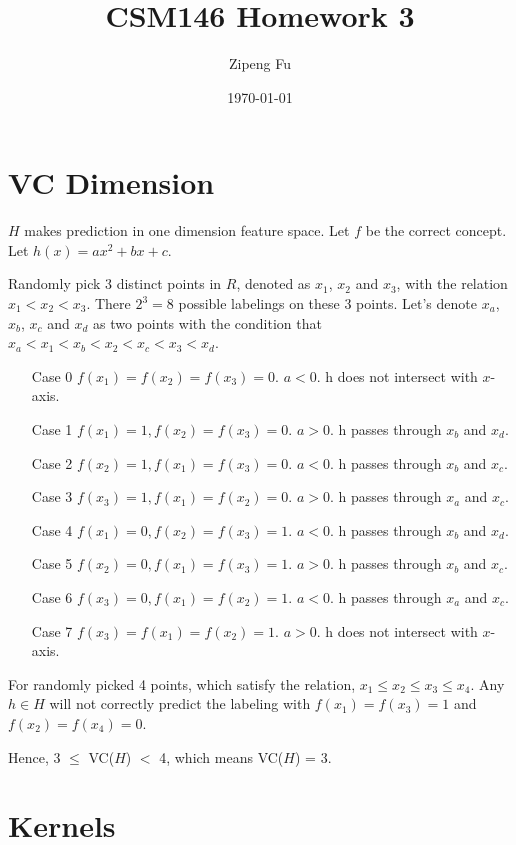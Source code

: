 \documentclass[11pt]{article}
\title{\textbf{CSM146 Homework 3}}
\author{Zipeng Fu}
\date{\today}
\begin{document}
\maketitle
\newpage 

\section{VC Dimension}
$H$ makes prediction in one dimension feature space. Let $f$ be the correct concept. Let $h(x) = ax^2 + bx + c$.

Randomly pick 3 distinct points in $R$, denoted as $x_1$, $x_2$ and $x_3$, with the relation  $x_1 < x_2 < x_3$. There $2^3 = 8$ possible labelings on these 3 points. Let's denote $x_a$, $x_b$, $x_c$ and $x_d$ as two points with the condition that $x_a < x_1 < x_b < x_2 < x_c < x_3 < x_d$. 
\begin{enumerate}
    \item[Case 0] $f(x_1) = f(x_2) = f(x_3) = 0$. $a < 0$. h does not intersect with $x$-axis.
    \item[Case 1] $f(x_1) = 1, f(x_2) = f(x_3) = 0$. $a > 0$. h passes through $x_b$ and $x_d$.
    \item[Case 2] $f(x_2) = 1, f(x_1) = f(x_3) = 0$. $a < 0$. h passes through $x_b$ and $x_c$.
    \item[Case 3] $f(x_3) = 1, f(x_1) = f(x_2) = 0$. $a > 0$. h passes through $x_a$ and $x_c$.
    \item[Case 4] $f(x_1) = 0, f(x_2) = f(x_3) = 1$. $a < 0$. h passes through $x_b$ and $x_d$.
    \item[Case 5] $f(x_2) = 0, f(x_1) = f(x_3) = 1$. $a > 0$. h passes through $x_b$ and $x_c$.
    \item[Case 6] $f(x_3) = 0, f(x_1) = f(x_2) = 1$. $a < 0$. h passes through $x_a$ and $x_c$.
    \item[Case 7] $f(x_3) = f(x_1) = f(x_2) = 1$. $a > 0$. h does not intersect with $x$-axis.
\end{enumerate}

For randomly picked 4 points, which satisfy the relation, $x_1 \leq x_2 \leq x_3 \leq x_4$. Any $h \in H$ will not correctly predict the labeling with $f(x_1) = f(x_3) = 1$ and $f(x_2) = f(x_4) = 0$.

Hence, 3 $\leq$ VC($H$) $<$ 4, which means VC($H$) = 3.

\section{Kernels}
\end{document}
